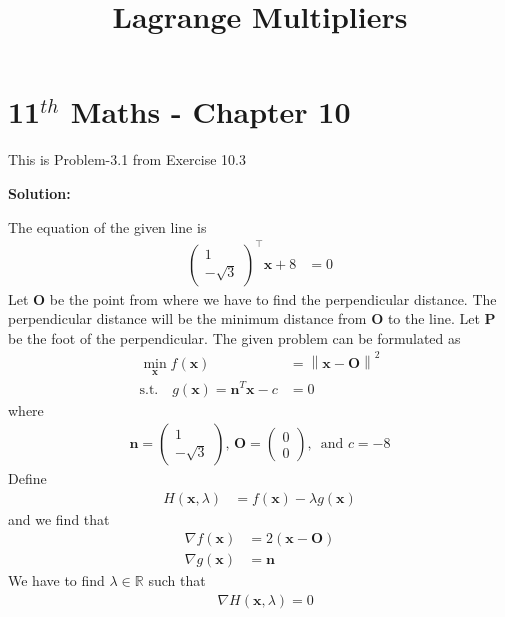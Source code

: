 \documentclass[12pt]{article}
\providecommand{\brak}[1]{\ensuremath{\left(#1\right)}}
\providecommand{\norm}[1]{\left\lVert#1\right\rVert}
\newcommand{\solution}{\noindent \textbf{Solution: }}
\newcommand{\myvec}[1]{\ensuremath{\begin{pmatrix}#1\end{pmatrix}}}
\let\vec\mathbf
\begin{document}
\begin{center}
\title{\textbf{Lagrange Multipliers}}
\date{\vspace{-5ex}} %
\maketitle
\end{center}
\setcounter{page}{1}

\section{11$^{th}$ Maths - Chapter 10}
This is Problem-3.1 from Exercise 10.3 
\begin{enumerate}

\solution 

The equation of the given line is 
\begin{align}
	\myvec{1 \\ -\sqrt{3}}^\top\vec{x}+8 &= 0
\end{align}
Let $\vec{O}$ be the point from where we have to find the perpendicular distance. The perpendicular distance will be the minimum distance from $\vec{O}$ to the line. Let $\vec{P}$ be the foot of the perpendicular. 
\fi
		The given  problem can be formulated as 
\begin{align}
	\label{eq:11/10/3/3/1/lagmul/Eq3}
	\min_{\vec{x}} f\brak{\vec{x}} &= \norm{\vec{x}-\vec{O}}^2\\
	\text{s.t.} \quad g\brak{\vec{x}} = \vec{n}^T\vec{x}-c &= 0 
	\label{eq:11/10/3/3/1/lagmul/Eq1}
\end{align}
where
\begin{align}
	\vec{n} = \myvec{1 \\ -\sqrt{3}},\, 
	\vec{O} = \myvec{0 \\ 0},\,
	\text{ and } c = -8
\end{align}
Define
\begin{align}
	H\brak{\vec{x}, \lambda} &= f\brak{\vec{x}} - \lambda g\brak{\vec{x}} 
\end{align}
and we find that 
\begin{align}
	\nabla f\brak{\vec{x}} &= 2\brak{\vec{x}-\vec{O}} \\
        \nabla g\brak{\vec{x}} &= \vec{n}
\end{align}
We have to find $\lambda \in \mathbb{R}$ such that
\begin{align}
	&\nabla H\brak{\vec{x},\lambda} = 0 \\
        \label{eq:11/10/3/3/1/lagmul/Eqlambda}

\end{align}
\end{enumerate}
\end{document}
